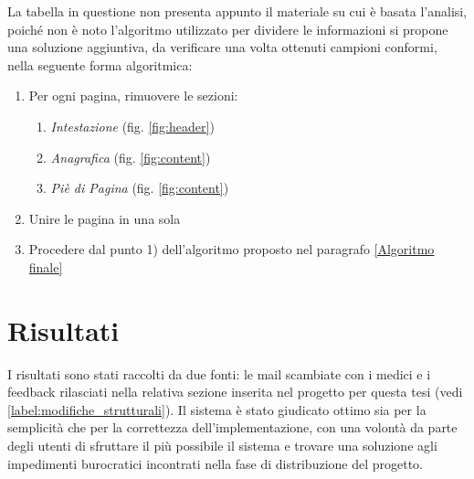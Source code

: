 La tabella in questione non presenta appunto il materiale su cui è basata l'analisi, poiché non è noto l'algoritmo utilizzato per dividere le informazioni si propone una soluzione aggiuntiva, da verificare una volta ottenuti campioni conformi, nella seguente forma algoritmica:
\begin{enumerate}
	\item Per ogni pagina, rimuovere le sezioni:
	\begin{enumerate}
		\item \textit{Intestazione} (fig. \ref{fig:header})
		\item \textit{Anagrafica} (fig. \ref{fig:content})	
		\item \textit{Piè di Pagina} (fig. \ref{fig:content})
	\end{enumerate}	
	\item Unire le pagina in una sola
	\item Procedere dal punto 1) dell'algoritmo proposto nel paragrafo \ref{Algoritmo finale}
\end{enumerate}
\newpage
\section{Risultati}
I risultati sono stati raccolti da due fonti: le mail scambiate con i medici e i feedback rilasciati nella relativa sezione inserita nel progetto per questa tesi (vedi \ref{label:modifiche_strutturali}).
Il sistema è stato giudicato ottimo sia per la semplicità che per la correttezza dell'implementazione, con una volontà da parte degli utenti di sfruttare il più possibile il sistema e trovare una soluzione agli impedimenti burocratici incontrati nella fase di distribuzione del progetto.




